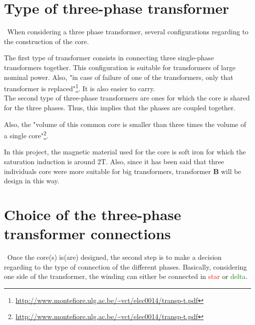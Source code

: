 \documentclass[12pt,a4paper]{report}
\begin{document}
\section{Type of three-phase transformer}
\quad\, When considering a three phase transformer, several configurations regarding to the construction of the core.

The first type of transformer consists in connecting three single-phase transformers together. This configuration is suitable for transformers of large nominal power. Also, "in case of failure of one of the transformers, only that transformer is replaced"\footnote{\url{http://www.montefiore.ulg.ac.be/~vct/elec0014/transp-t.pdf}}. It is also easier to carry.\\

The second type of three-phase transformers are ones for which the core is shared for the three phases. Thus, this implies that the phases are coupled together.

Also, the "volume of this common core is smaller than three times the volume of a single core"\footnote{\url{http://www.montefiore.ulg.ac.be/~vct/elec0014/transp-t.pdf}}.

In this project, the magnetic material used for the core is soft iron for which the saturation induction is around 2T. Also, since it has been said that three individuals core were more suitable for big transformers, transformer \textbf{B} will be design in this way.

\section{Choice of the three-phase transformer connections}
\quad\, Once the core(s) is(are) designed, the second step is to make a decision regarding to the type of connection of the different phases. Basically, considering one side of the transformer, the winding can either be connected in \textcolor{red}{star} or \textcolor{green}{delta}.
\end{document}
